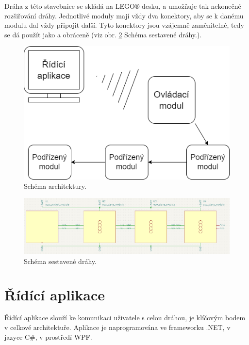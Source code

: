     Dráha z této stavebnice se skládá na LEGO® desku, a umožňuje tak nekonečné rozšiřování dráhy. Jednotlivé moduly mají vždy dva konektory, aby se k danému modulu dal vždy připojit další. Tyto konektory jsou vzájemně zaměnitelné, tedy  se dá použít jako  a obráceně (viz obr. \ref{fig:track-design} Schéma sestavené dráhy.).
 \begin{figure}[H]
                \begin{center}
                    \includegraphics[scale=0.8]{images/schema_architektury.drawio (1).png}
          \caption{Schéma architektury.}
          \label{fig:architecture}
                \end{center}  
        \end{figure}
    \begin{figure}[h!]
          \includegraphics[width=\textwidth]{images/schema_zapojeni.png}
          \caption{Schéma sestavené dráhy.}
          \label{fig:track-design}
        \end{figure}
               
        \newpage
    \section{Řídící aplikace}
        Řídící aplikace slouží ke komunikaci uživatele s celou dráhou, je klíčovým bodem v celkové architektuře. Aplikace je naprogramována ve frameworku .NET, v jazyce C\#, v prostředí WPF.
        
